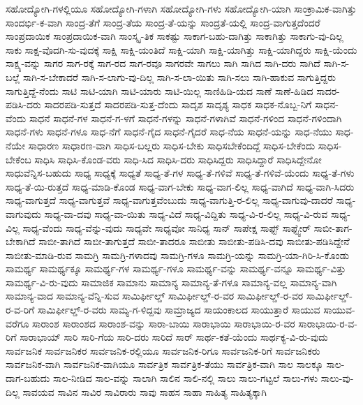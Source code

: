 {ಸಹೋದ್ಯೋಗಿ-ಗಳಲ್ಲಿಯೂ
ಸಹೋದ್ಯೋಗಿ-ಗಳಾಗಿ
ಸಹೋದ್ಯೋಗಿ-ಗಳು
ಸಹೋದ್ಯೋಗಿ-ಯಾಗಿ
ಸಾಂಕ್ರಾಮಿಕ-ವಾಗಿತ್ತು
ಸಾಂದರ್ಭಿ-ಕ-ವಾಗಿ
ಸಾಂದ್ರ-ತೆಗೆ
ಸಾಂದ್ರ-ತೆಯ
ಸಾಂದ್ರ-ತೆ-ಯನ್ನು
ಸಾಂದ್ರತೆ-ಯಲ್ಲಿ
ಸಾಂದ್ರ-ವಾಗುತ್ತದೆಂದರೆ
ಸಾಂಪ್ರದಾಯಿಕ
ಸಾಂಪ್ರದಾಯಿಕ-ವಾಗಿ
ಸಾಂಸ್ಕೃ-ತಿಕ
ಸಾಕಷ್ಟು
ಸಾಕಾಗ-ಬಹು-ದಾಗಿತ್ತು
ಸಾಕಾಗಿತ್ತು
ಸಾಕಾಗು-ವು-ದಿಲ್ಲ
ಸಾಕು
ಸಾಕ್ಷ-ವೊದಗಿ-ಸು-ವುದಕ್ಕೆ
ಸಾಕ್ಷಿ
ಸಾಕ್ಷಿ-ಯಂತಿದೆ
ಸಾಕ್ಷಿ-ಯಾಗಿ
ಸಾಕ್ಷಿ-ಯಾಗಿತ್ತು
ಸಾಕ್ಷಿ-ಯಾಗಿದ್ದರು
ಸಾಕ್ಷಿ-ಯೆಂದು
ಸಾಕ್ಷ್ಯ-ವನ್ನು
ಸಾಗರ
ಸಾಗ-ರಕ್ಕೆ
ಸಾಗ-ರದ
ಸಾಗ-ರವೂ
ಸಾಗರವೇ
ಸಾಗಲು
ಸಾಗಿ
ಸಾಗಿದ
ಸಾಗಿ-ದರು
ಸಾಗಿದೆ
ಸಾಗಿ-ಸ-ಬಲ್ಲೆ
ಸಾಗಿ-ಸ-ಬೇಕಾದರೆ
ಸಾಗಿ-ಸ-ಲಾಗು-ವು-ದಿಲ್ಲ
ಸಾಗಿ-ಸ-ಲಾ-ಯಿತು
ಸಾಗಿ-ಸಲು
ಸಾಗಿ-ಹಾಕುವ
ಸಾಗುತ್ತಿದ್ದರು
ಸಾಗುತ್ತಿದ್ದೆ-ನೆಂದು
ಸಾಟಿ
ಸಾಟಿ-ಯಾಗಿ
ಸಾಟಿ-ಯಾರು
ಸಾಟಿ-ಯಿಲ್ಲ
ಸಾಣಿಹಿಡಿ-ಯದ
ಸಾಣೆ
ಸಾಣೆ-ಹಿಡಿದ
ಸಾದರ-ಪಡಿಸಿ-ದರು
ಸಾದರಪಡಿ-ಸುತ್ತದೆ
ಸಾದರಪಡಿ-ಸುತ್ತ-ದೆಂದು
ಸಾದೃಶ
ಸಾದೃಶ್ಯ
ಸಾಧಕ
ಸಾಧಕ-ನೊಬ್ಬ-ನಿಗೆ
ಸಾಧನ-ವೆಂದು
ಸಾಧನೆ
ಸಾಧನೆ-ಗಳ
ಸಾಧನೆ-ಗ-ಳಗೆ
ಸಾಧನೆ-ಗಳನ್ನು
ಸಾಧನೆ-ಗಳಾಗಿವೆ
ಸಾಧನೆ-ಗಳಿಂದ
ಸಾಧನೆ-ಗಳಿಂದಾಗಿ
ಸಾಧನೆ-ಗಳು
ಸಾಧನೆ-ಗಳೂ
ಸಾಧ-ನೆಗೆ
ಸಾಧನೆ-ಗೈದ
ಸಾಧನೆ-ಗೈದರೆ
ಸಾಧ-ನೆಯ
ಸಾಧನೆ-ಯನ್ನು
ಸಾಧ-ನೆಯು
ಸಾಧ-ನೆಯೇ
ಸಾಧಾರಣ
ಸಾಧಾರಣ-ವಾಗಿ
ಸಾಧಿಸ-ಬಲ್ಲರು
ಸಾಧಿಸ-ಬೇಕು
ಸಾಧಿಸಬೇಕೆಂದಿದ್ದೆ
ಸಾಧಿಸ-ಬೇಕೆಂದು
ಸಾಧಿಸ-ಬೇಕೆಂಬ
ಸಾಧಿಸಿ
ಸಾಧಿಸಿ-ಕೊಂಡ-ವರು
ಸಾಧಿ-ಸಿದ
ಸಾಧಿಸಿ-ದರು
ಸಾಧಿಸಿದ್ದರು
ಸಾಧಿಸಿದ್ದಾರೆ
ಸಾಧಿಸಿದ್ದೇನೋ
ಸಾಧುವೆನ್ನಿಸ-ಬಹುದು
ಸಾಧ್ಯ
ಸಾಧ್ಯಕ್ಕೆ
ಸಾಧ್ಯತೆ
ಸಾಧ್ಯ-ತೆ-ಗಳ
ಸಾಧ್ಯ-ತೆ-ಗಳಿವೆ
ಸಾಧ್ಯ-ತೆ-ಗಳಿವೆ-ಯೆಂದು
ಸಾಧ್ಯ-ತೆ-ಗಳು
ಸಾಧ್ಯ-ತೆ-ಯಿ-ರುತ್ತದೆ
ಸಾಧ್ಯ-ಮಾಡಿ-ಕೊಂಡ
ಸಾಧ್ಯ-ವಾಗ-ಬೇಕು
ಸಾಧ್ಯ-ವಾಗ-ಲಿಲ್ಲ
ಸಾಧ್ಯ-ವಾಗಿದೆ
ಸಾಧ್ಯ-ವಾಗಿ-ಸಿದರು
ಸಾಧ್ಯ-ವಾಗುತ್ತದೆ
ಸಾಧ್ಯ-ವಾಗುತ್ತವೆ
ಸಾಧ್ಯ-ವಾಗುತ್ತವೆಂಬುದು
ಸಾಧ್ಯ-ವಾಗುತ್ತಿ-ರ-ಲಿಲ್ಲ
ಸಾಧ್ಯ-ವಾಗುವು-ದಾದರೆ
ಸಾಧ್ಯ-ವಾಗುವುದು
ಸಾಧ್ಯ-ವಾ-ದವು
ಸಾಧ್ಯ-ವಾ-ಯಿತು
ಸಾಧ್ಯ-ವಿದೆ
ಸಾಧ್ಯ-ವಿದ್ದಿತು
ಸಾಧ್ಯ-ವಿ-ರ-ಲಿಲ್ಲ
ಸಾಧ್ಯ-ವಿ-ರುವ
ಸಾಧ್ಯ-ವಿಲ್ಲ
ಸಾಧ್ಯ-ವೆಂದು
ಸಾಧ್ಯ-ವೆನ್ನು-ವುದು
ಸಾಧ್ಯವೇ
ಸಾಧ್ಯವೋ
ಸಾನಿಧ್ಯ
ಸಾನ್
ಸಾಪೇಕ್ಷ
ಸಾಫ್ಟ್
ಸಾಫ್ಟ್ವೇರ್
ಸಾಬೀ-ತಾಗ-ಬೇಕಾಗಿದೆ
ಸಾಬೀ-ತಾಗಿದೆ
ಸಾಬೀ-ತಾಗುತ್ತದೆ
ಸಾಬೀ-ತಾದರೂ
ಸಾಬೀತು
ಸಾಬೀತು-ಪಡಿಸಿ-ದವು
ಸಾಬೀತು-ಪಡಿಸಿದ್ದೇನೆ
ಸಾಬೀತು-ಮಾಡಿ-ರುವ
ಸಾಮಗ್ರಿ
ಸಾಮಗ್ರಿ-ಗಳಾದವು
ಸಾಮಗ್ರಿ-ಗಳೂ
ಸಾಮಗ್ರಿ-ಯನ್ನು
ಸಾಮಗ್ರಿ-ಯಾ-ಗಿರಿ-ಸಿ-ಕೊಂಡು
ಸಾಮರ್ಥ್ಯ
ಸಾಮರ್ಥ್ಯಕ್ಕೂ
ಸಾಮರ್ಥ್ಯ-ಗಳ
ಸಾಮರ್ಥ್ಯ-ಗಳೂ
ಸಾಮರ್ಥ್ಯ-ವನ್ನು
ಸಾಮರ್ಥ್ಯ-ವನ್ನೂ
ಸಾಮರ್ಥ್ಯ-ವಿತ್ತು
ಸಾಮರ್ಥ್ಯ-ವಿ-ರು-ವುದು
ಸಾಮಾಜಿಕ
ಸಾಮಾನು
ಸಾಮಾನ್ಯ
ಸಾಮಾನ್ಯ-ತೆ-ಗಳೂ
ಸಾಮಾನ್ಯ-ವಲ್ಲ
ಸಾಮಾನ್ಯ-ವಾಗಿ
ಸಾಮಾನ್ಯ-ವಾದ
ಸಾಮಾನ್ಯ-ವೆನ್ನಿ-ಸುವ
ಸಾಮಿರ್ಫೀಲ್ಡ್
ಸಾಮಿರ್ಫೀಲ್ಡ್-ರ-ವರ
ಸಾಮಿರ್ಫೀಲ್ಡ್-ರ-ವರ
ಸಾಮಿರ್ಫೀಲ್ಡ್-ರ-ವ-ರಿಗೆ
ಸಾಮಿರ್ಫೀಲ್ಡ್-ರ-ವರು
ಸಾಮ್ಯ-ಗ-ಳಿದ್ದವು
ಸಾಮ್ರಾಜ್ಯದ
ಸಾಯಂಕಾಲದ
ಸಾಯುತ್ತಾರೆ
ಸಾಯುವ
ಸಾಯುವ-ವರೆಗೂ
ಸಾರಾಂಶ
ಸಾರಾಂಶದ
ಸಾರಾಂಶ-ವನ್ನು
ಸಾರಾ-ಬಾಯಿ
ಸಾರಾಭಾಯಿ
ಸಾರಾಭಾಯಿ-ರ-ವರ
ಸಾರಾಭಾಯಿ-ರ-ವ-ರಿಗೆ
ಸಾರಾಭಾಯ್
ಸಾರಿ
ಸಾರಿ-ಗೆಯ
ಸಾರಿ-ದರು
ಸಾರಿದೆ
ಸಾರ್
ಸಾರ್ಥ-ಕತೆ-ಯೆಂದು
ಸಾರ್ಥಕ್ಯ-ವಿ-ರು-ವುದು
ಸಾರ್ವಜನಿಕ
ಸಾರ್ವಜನಿಕರ
ಸಾರ್ವಜನಿಕ-ರಲ್ಲಿಯೂ
ಸಾರ್ವಜನಿಕ-ರಿಗೂ
ಸಾರ್ವಜನಿಕ-ರಿಗೆ
ಸಾರ್ವಜನಿಕರು
ಸಾರ್ವಜನಿಕ-ವಾಗಿ
ಸಾರ್ವಜನಿಕ-ವಾಗಿಯೂ
ಸಾರ್ವತ್ರಿಕ
ಸಾರ್ವತ್ರಿಕ-ತೆಯು
ಸಾರ್ವತ್ರಿಕ-ವಾಗಿ
ಸಾಲ
ಸಾಲಕ್ಕೂ
ಸಾಲ-ದಾಗ-ಬಹುದು
ಸಾಲ-ನೀಡಿದ
ಸಾಲ-ವನ್ನು
ಸಾಲಾಗಿ
ಸಾಲಿನ
ಸಾಲಿ-ನಲ್ಲಿ
ಸಾಲು
ಸಾಲು-ಗಟ್ಟಲೆ
ಸಾಲು-ಗಳು
ಸಾಲು-ವು-ದಿಲ್ಲ
ಸಾವಯವ
ಸಾವಿನ
ಸಾವಿರ
ಸಾವಿರಾರು
ಸಾವು
ಸಾಹಸ
ಸಾಹಾ
ಸಾಹಿತ್ಯ
ಸಾಹಿತ್ಯಕ್ಕಾಗಿ
}
